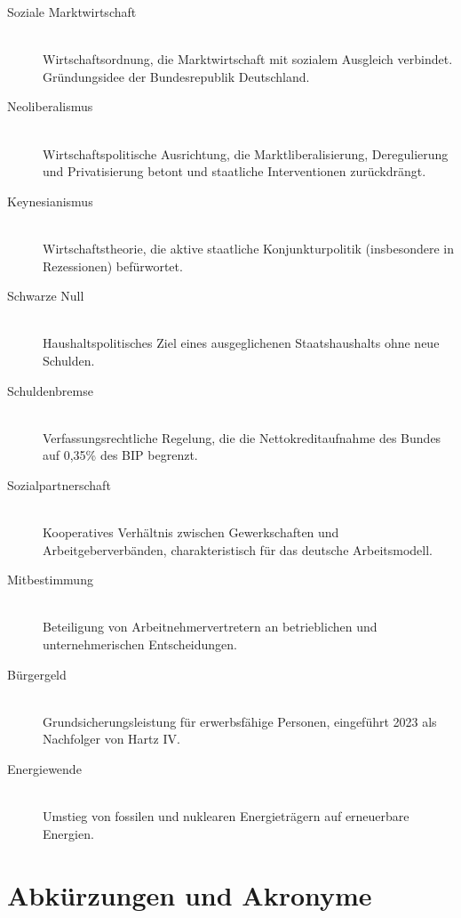 \begin{description}
    \item[Soziale Marktwirtschaft] \hfill \\
    Wirtschaftsordnung, die Marktwirtschaft mit sozialem Ausgleich verbindet. Gründungsidee der Bundesrepublik Deutschland.
    
    \item[Neoliberalismus] \hfill \\
    Wirtschaftspolitische Ausrichtung, die Marktliberalisierung, Deregulierung und Privatisierung betont und staatliche Interventionen zurückdrängt.
    
    \item[Keynesianismus] \hfill \\
    Wirtschaftstheorie, die aktive staatliche Konjunkturpolitik (insbesondere in Rezessionen) befürwortet.
    
    \item[Schwarze Null] \hfill \\
    Haushaltspolitisches Ziel eines ausgeglichenen Staatshaushalts ohne neue Schulden.
    
    \item[Schuldenbremse] \hfill \\
    Verfassungsrechtliche Regelung, die die Nettokreditaufnahme des Bundes auf 0,35\% des BIP begrenzt.
    
    \item[Sozialpartnerschaft] \hfill \\
    Kooperatives Verhältnis zwischen Gewerkschaften und Arbeitgeberverbänden, charakteristisch für das deutsche Arbeitsmodell.
    
    \item[Mitbestimmung] \hfill \\
    Beteiligung von Arbeitnehmervertretern an betrieblichen und unternehmerischen Entscheidungen.
    
    \item[Bürgergeld] \hfill \\
    Grundsicherungsleistung für erwerbsfähige Personen, eingeführt 2023 als Nachfolger von Hartz IV.
    
    \item[Energiewende] \hfill \\
    Umstieg von fossilen und nuklearen Energieträgern auf erneuerbare Energien.
\end{description}

\section{Abkürzungen und Akronyme}

